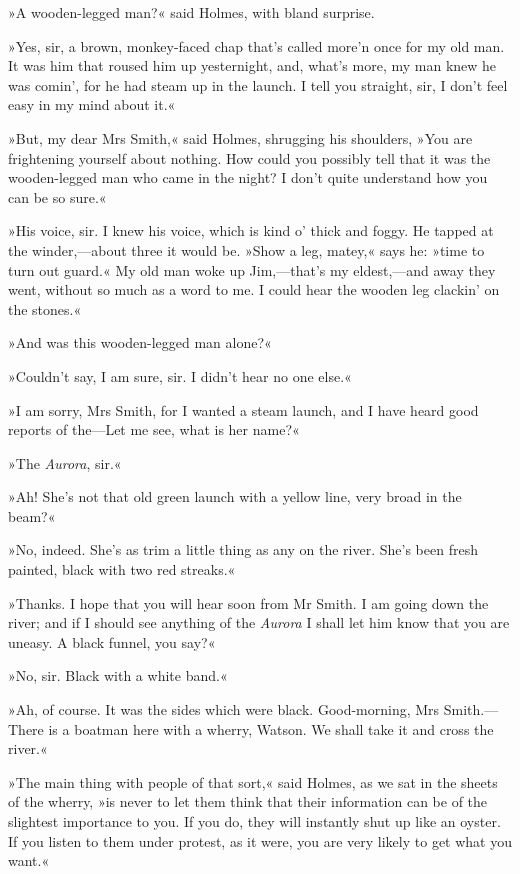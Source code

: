 »A wooden-legged man?« said Holmes, with bland surprise.

»Yes, sir, a brown, monkey-faced chap that's called more'n once for my old man. It was him that roused him up yesternight, and, what's more, my man knew he was comin', for he had steam up in the launch. I tell you straight, sir, I don't feel easy in my mind about it.«

»But, my dear Mrs Smith,« said Holmes, shrugging his shoulders, »You are frightening yourself about nothing. How could you possibly tell that it was the wooden-legged man who came in the night? I don't quite understand how you can be so sure.«

»His voice, sir. I knew his voice, which is kind o' thick and foggy. He tapped at the winder,—about three it would be. »Show a leg, matey,« says he: »time to turn out guard.« My old man woke up Jim,—that's my eldest,—and away they went, without so much as a word to me. I could hear the wooden leg clackin' on the stones.«

»And was this wooden-legged man alone?«

»Couldn't say, I am sure, sir. I didn't hear no one else.«

»I am sorry, Mrs Smith, for I wanted a steam launch, and I have heard good reports of the—Let me see, what is her name?«

»The \textit{Aurora}, sir.«

»Ah! She's not that old green launch with a yellow line, very broad in the beam?«

»No, indeed. She's as trim a little thing as any on the river. She's been fresh painted, black with two red streaks.«

»Thanks. I hope that you will hear soon from Mr Smith. I am going down the river; and if I should see anything of the \textit{Aurora} I shall let him know that you are uneasy. A black funnel, you say?«

»No, sir. Black with a white band.«

»Ah, of course. It was the sides which were black. Good-morning, Mrs Smith.—There is a boatman here with a wherry, Watson. We shall take it and cross the river.«

»The main thing with people of that sort,« said Holmes, as we sat in the sheets of the wherry, »is never to let them think that their information can be of the slightest importance to you. If you do, they will instantly shut up like an oyster. If you listen to them under protest, as it were, you are very likely to get what you want.«

